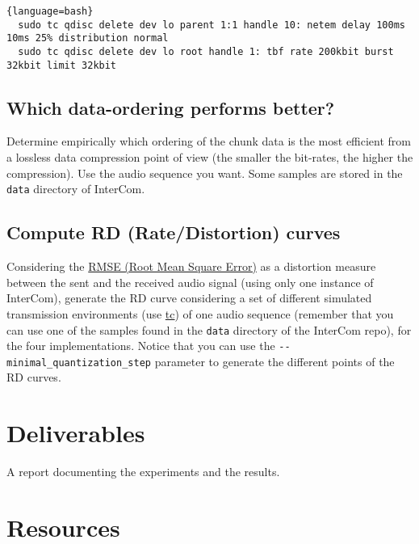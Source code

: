 \begin{lstlisting}{language=bash}
  sudo tc qdisc delete dev lo parent 1:1 handle 10: netem delay 100ms 10ms 25% distribution normal
  sudo tc qdisc delete dev lo root handle 1: tbf rate 200kbit burst 32kbit limit 32kbit
\end{lstlisting}

\subsection{Which data-ordering performs better?}
Determine empirically which ordering of the chunk data is the most
efficient from a lossless data compression point of view (the smaller
the bit-rates, the higher the compression). Use the audio sequence you
want. Some samples are stored in the \verb|data| directory of
InterCom.

\subsection{Compute RD (Rate/Distortion) curves}
Considering the
\href{https://en.wikipedia.org/wiki/Root-mean-square_deviation}{RMSE
  (Root Mean Square Error)} as a distortion measure between the sent and
the received audio signal (using only one instance of InterCom),
generate the RD curve considering a set of different simulated
transmission environments (use
\href{https://man7.org/linux/man-pages/man8/tc.8.html}{tc}) of one
audio sequence (remember that you can use one of the samples found in
the \verb|data| directory of the InterCom repo), for the four
implementations. Notice that you can use the
\verb|--minimal_quantization_step| parameter to generate the different
points of the RD curves.


\section{Deliverables}

A report documenting the experiments and the results.

\section{Resources}


